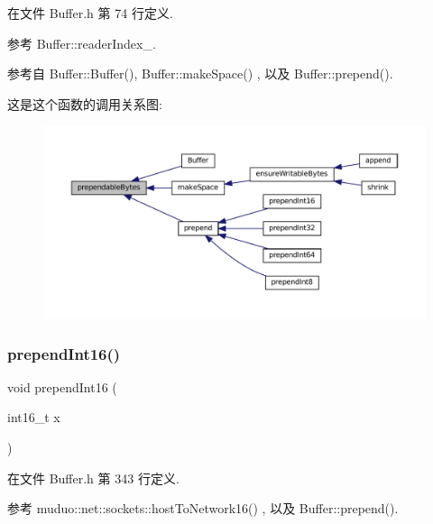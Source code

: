 在文件 Buffer.\+h 第 74 行定义.



参考 Buffer\+::reader\+Index\+\_\+.



参考自 Buffer\+::\+Buffer(), Buffer\+::make\+Space() , 以及 Buffer\+::prepend().

这是这个函数的调用关系图\+:
\nopagebreak
\begin{figure}[H]
\begin{center}
\leavevmode
\includegraphics[width=350pt]{classmuduo_1_1net_1_1Buffer_ad738bbd8321f518ca5cdfac842993d04_icgraph}
\end{center}
\end{figure}
\mbox{\label{classmuduo_1_1net_1_1Buffer_a1c47f5d97958f529ef78f0ba283e33d0}} 
\subsubsection{\texorpdfstring{prepend\+Int16()}{prependInt16()}}
{\footnotesize\ttfamily void prepend\+Int16 (\begin{DoxyParamCaption}\item[{int16\+\_\+t}]{x }\end{DoxyParamCaption})\hspace{0.3cm}{\ttfamily [inline]}}



在文件 Buffer.\+h 第 343 行定义.



参考 muduo\+::net\+::sockets\+::host\+To\+Network16() , 以及 Buffer\+::prepend().

